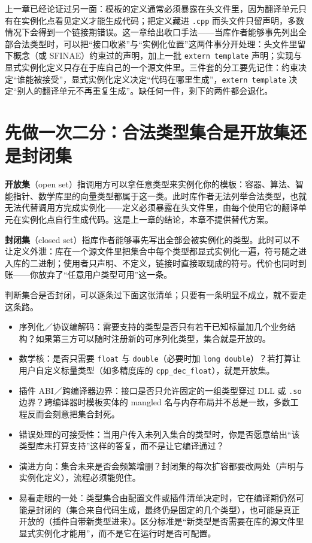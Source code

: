 \documentclass[12pt,a4paper,fontset=fandol]{ctexbook}
\newcommand{\kw}[1]{\texttt{#1}}
\begin{document}
上一章已经论证过另一面：模板的定义通常必须暴露在头文件里，因为翻译单元只有在实例化点看见定义才能生成代码；把定义藏进 \kw{.cpp} 而头文件只留声明，多数情况下会得到一个链接期错误。这一章给出收口手法——当库作者能够事先列出全部合法类型时，可以把“接口收紧”与“实例化位置”这两件事分开处理：头文件里留下概念（或 SFINAE）约束过的声明，加上一批 \kw{extern template} 声明；实现与显式实例化定义只存在于库自己的一个源文件里。三件套的分工要先记住：约束决定“谁能被接受”，显式实例化定义决定“代码在哪里生成”，\kw{extern template} 决定“别人的翻译单元不再重复生成”。缺任何一件，剩下的两件都会退化。

\section{先做一次二分：合法类型集合是开放集还是封闭集}

\textbf{开放集}（open set）指调用方可以拿任意类型来实例化你的模板：容器、算法、智能指针、数学库里的向量类型都属于这一类。此时库作者无法列举合法类型，也就无法代替调用方完成实例化——定义必须暴露在头文件里，由每个使用它的翻译单元在实例化点自行生成代码。这是上一章的结论，本章不提供替代方案。

\textbf{封闭集}（closed set）指库作者能够事先写出全部会被实例化的类型。此时可以不让定义外泄：库在一个源文件里把集合中每个类型都显式实例化一遍，符号随之进入库的二进制；使用者只声明、不定义，链接时直接取现成的符号。代价也同时到账——你放弃了“任意用户类型可用”这一条。

判断集合是否封闭，可以逐条过下面这张清单；只要有一条明显不成立，就不要走这条路。

\begin{itemize}
  \item 序列化／协议编解码：需要支持的类型是否只有若干已知标量加几个业务结构？如果第三方可以随时注册新的可序列化类型，集合就是开放的。
  \item 数学核：是否只需要 \kw{float} 与 \kw{double}（必要时加 \kw{long double}）？若打算让用户自定义标量类型（如多精度库的 \kw{cpp\_dec\_float}），就是开放集。
  \item 插件 ABI／跨编译器边界：接口是否只允许固定的一组类型穿过 DLL 或 \kw{.so} 边界？跨编译器时模板实体的 mangled 名与内存布局并不总是一致，多数工程反而会刻意把集合封死。
  \item 错误处理的可接受性：当用户传入未列入集合的类型时，你是否愿意给出“该类型库未打算支持”这样的答复，而不是让它编译通过？
  \item 演进方向：集合未来是否会频繁增删？封闭集的每次扩容都要改两处（声明与实例化定义），流程必须能兜住。
  \item 易看走眼的一处：类型集合由配置文件或插件清单决定时，它在编译期仍然可能是封闭的（集合来自代码生成，最终仍是固定的几个类型），也可能是真正开放的（插件自带新类型进来）。区分标准是“新类型是否需要在库的源文件里显式实例化才能用”，而不是它在运行时是否可配置。
\end{itemize}
\end{document}
